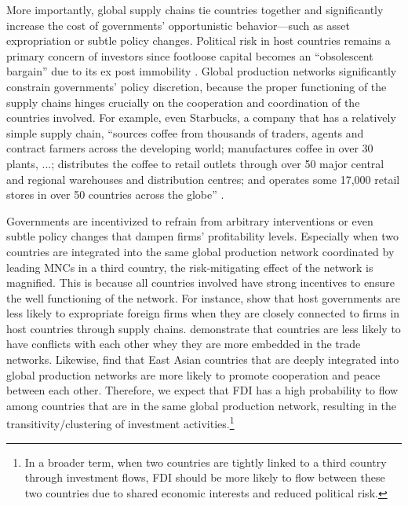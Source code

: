 \documentclass[reqno,onecolumn,letterpaper,12pt]{article}
\begin{document}
More importantly, global supply chains tie countries together and significantly increase the cost of governments' opportunistic behavior---such as asset expropriation or subtle policy changes. Political risk in host countries remains a primary concern of investors since footloose capital becomes an ``obsolescent bargain'' due to its ex post immobility \citep{Vernon:1971,Vernon:1980}. Global production networks significantly constrain governments' policy discretion, because the proper functioning of the supply chains hinges crucially on the cooperation and coordination of the countries involved. For example, even Starbucks, a company that has a relatively simple supply chain, ``sources coffee from thousands of traders, agents and contract farmers across the developing world; manufactures coffee in over 30 plants, ...; distributes the coffee to retail outlets through over 50 major central and regional warehouses and distribution centres; and operates some 17,000 retail stores in over 50 countries across the globe'' \citep[142]{UNCTAD:2013}.

Governments are incentivized to refrain from arbitrary interventions or even subtle policy changes that dampen firms' profitability levels. Especially when two countries are integrated into the same global production network coordinated by leading MNCs in a third country, the risk-mitigating effect of the network is magnified. This is because all countries involved have strong incentives to ensure the well functioning of the network. For instance, \citet{johns2016under} show that host governments are less likely to expropriate foreign firms when they are closely connected to firms in host countries through supply chains. \citet{Dorussen_Ward:2010} demonstrate that countries are less likely to have conflicts with each other whey they are more embedded in the trade networks. Likewise, \citet{Kim_Solingen:2017} find that East Asian countries that are deeply integrated into global production networks are more likely to promote cooperation and peace between each other. Therefore, we expect that FDI has a high probability to flow among countries that are in the same global production network, resulting in the transitivity/clustering of investment activities.\footnote{In a broader term, when two countries are tightly linked to a third country through investment flows, FDI should be more likely to flow between these two countries due to shared economic interests and reduced political risk. }
\end{document}
